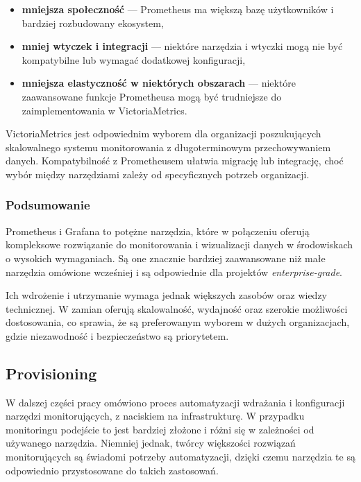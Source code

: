 \documentclass{article}
\begin{document}
\begin{itemize}
    \item \textbf{mniejsza społeczność} — Prometheus ma większą bazę użytkowników i bardziej rozbudowany ekosystem,
    \item \textbf{mniej wtyczek i integracji} — niektóre narzędzia i wtyczki mogą nie być kompatybilne lub wymagać dodatkowej konfiguracji,
    \item \textbf{mniejsza elastyczność w niektórych obszarach} — niektóre zaawansowane funkcje Prometheusa mogą być trudniejsze do zaimplementowania w VictoriaMetrics.
\end{itemize}


VictoriaMetrics jest odpowiednim wyborem dla organizacji poszukujących skalowalnego systemu monitorowania z długoterminowym przechowywaniem danych. Kompatybilność z Prometheusem ułatwia migrację lub integrację, choć wybór między narzędziami zależy od specyficznych potrzeb organizacji.

\subsubsection{Podsumowanie}

Prometheus i Grafana to potężne narzędzia, które w połączeniu oferują kompleksowe rozwiązanie do monitorowania i wizualizacji danych w środowiskach o wysokich wymaganiach. Są one znacznie bardziej zaawansowane niż małe narzędzia omówione wcześniej i są odpowiednie dla projektów \textit{enterprise-grade}.

Ich wdrożenie i utrzymanie wymaga jednak większych zasobów oraz wiedzy technicznej. W zamian oferują skalowalność, wydajność oraz szerokie możliwości dostosowania, co sprawia, że są preferowanym wyborem w dużych organizacjach, gdzie niezawodność i bezpieczeństwo są priorytetem.

\subsection{Provisioning}

W dalszej części pracy omówiono proces automatyzacji wdrażania i konfiguracji narzędzi monitorujących, z naciskiem na infrastrukturę. W przypadku monitoringu podejście to jest bardziej złożone i różni się w zależności od używanego narzędzia. Niemniej jednak, twórcy większości rozwiązań monitorujących są świadomi potrzeby automatyzacji, dzięki czemu narzędzia te są odpowiednio przystosowane do takich zastosowań.
\end{document}
